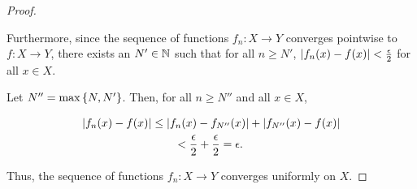 \begin{answer}
\begin{claim}
\begin{proof}
\begin{enumarabic}
\begin{enumarabic}
          \item
            Furthermore, since the sequence of functions $f_n : X \to Y$ converges
            pointwise to $f : X \to Y$,
            there exists an $N' \in \mathbb{N}$ such that for all $n \geq N'$,
            $\lvert f_n(x) - f(x)\rvert < \frac{\epsilon}{2}$ for all $x \in X$.

          \item
            Let $N'' = \max \left\{N, N'\right\}$.
            Then, for all $n \geq N''$ and all $x \in X$,
        \end{enumarabic}
        \begin{align*}
          \lvert f_n(x) - f(x)\rvert
            &\leq \lvert f_n(x) - f_{N''}(x)\rvert + \lvert f_{N''}(x) - f(x)\rvert \\
            &\qquad < \frac{\epsilon}{2} + \frac{\epsilon}{2} = \epsilon.
        \end{align*}
      \end{enumarabic}
      Thus, the sequence of functions $f_n : X \to Y$ converges uniformly on $X$.
    \end{proof}
  \end{claim}
\end{answer}
